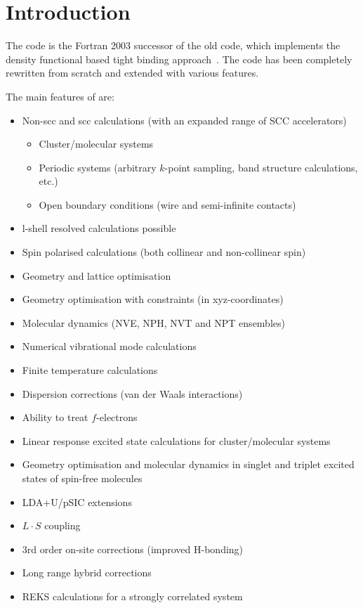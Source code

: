 \chapter{Introduction}

The code {\dftbp} is the Fortran 2003 successor of the old {\dftb} code, which
implements the density functional based tight binding
approach~\cite{frauenheim-JPCM-14-3015}. The code has been completely rewritten
from scratch and extended with various features.

The main features of {\dftbp} are:
\begin{itemize}
\item Non-scc and scc calculations (with an expanded range of SCC
  accelerators)
  \begin{itemize}
  \item Cluster/molecular systems
  \item Periodic systems (arbitrary $k$-point sampling, band structure
    calculations, etc.)
  \item Open boundary conditions (wire and semi-infinite contacts)
  \end{itemize}
\item l-shell resolved calculations possible
\item Spin polarised calculations (both collinear and non-collinear
  spin)
\item Geometry and lattice optimisation
\item Geometry optimisation with constraints (in xyz-coordinates)
\item Molecular dynamics (NVE, NPH, NVT and NPT ensembles)
\item Numerical vibrational mode calculations
\item Finite temperature calculations
\item Dispersion corrections (van der Waals interactions)
\item Ability to treat $f$-electrons
\item Linear response excited state calculations for cluster/molecular systems
\item Geometry optimisation and molecular dynamics in singlet and triplet
  excited states of spin-free molecules
\item LDA+U/pSIC extensions
\item $L \cdot S$ coupling
\item 3rd order on-site corrections (improved H-bonding)
\item Long range hybrid corrections
\item REKS calculations for a strongly correlated system

\end{itemize}
